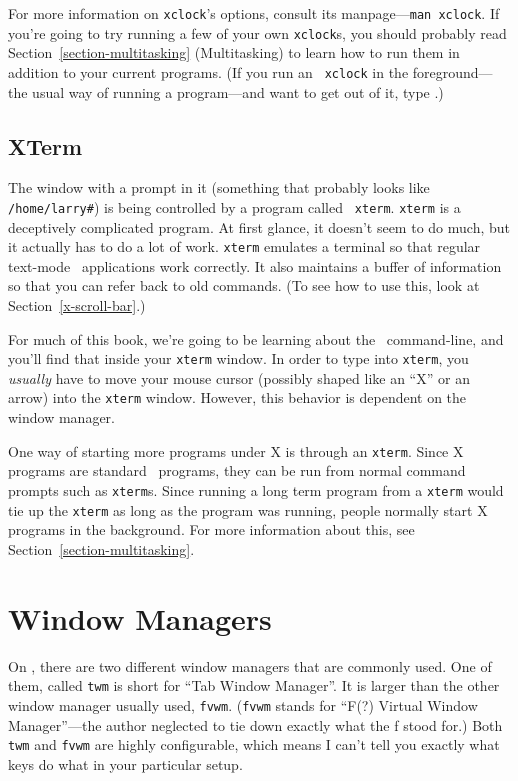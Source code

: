 For more information on {\tt xclock}'s options, consult its
manpage---{\tt man xclock}. If you're going to try running a few of
your own {\tt xclock}s, you should probably read
Section~\ref{section-multitasking} (Multitasking) to learn how to run
them in addition to your current programs.  (If you run an {\tt
  xclock} in the foreground---the usual way of running a program---and
want to get out of it, type .)

\subsection{XTerm} %

The window with a prompt in it (something that probably looks like
{\tt /home/larry\#}) is being controlled by a program called {\tt
  xterm}.  {\tt xterm} is a deceptively complicated
program.  At first glance, it doesn't seem to do much, but it actually
has to do a lot of work.  {\tt xterm} emulates a terminal so that
regular text-mode \unix\ applications work correctly.  It also
maintains a buffer of information so that you can refer back to old
commands.  (To see how to use this, look at
Section~\ref{x-scroll-bar}.)

For much of this book, we're going to be learning about the \unix\ 
command-line, and you'll find that inside your {\tt xterm} window.
In order to type into {\tt xterm}, you {\em usually\/} have to move
your mouse cursor (possibly shaped like an ``X'' or an arrow) into the
{\tt xterm} window.  However, this behavior is dependent on the window
manager.

One way of starting more programs under X is through an {\tt xterm}.
Since X programs are standard \unix\ programs, they can be run from
normal command prompts such as {\tt xterm}s.  Since running a long
term program from a {\tt xterm} would tie up the {\tt xterm} as long
as the program was running, people normally start X programs in the
background.  For more information about this, see
Section~\ref{section-multitasking}.

\section{Window Managers}

On \linux, there are two different window managers that are commonly
used.  One of them, called {\tt twm}\ttindex{twm} is short for ``Tab
Window Manager''. %
It is larger than the other window manager usually used, {\tt fvwm}.
({\tt fvwm} stands for ``F(?) Virtual Window Manager''---the author
neglected to tie down exactly what the f stood for.)  Both {\tt twm}
and {\tt fvwm} are highly configurable, which means I can't tell you
exactly what keys do what in your particular setup.


